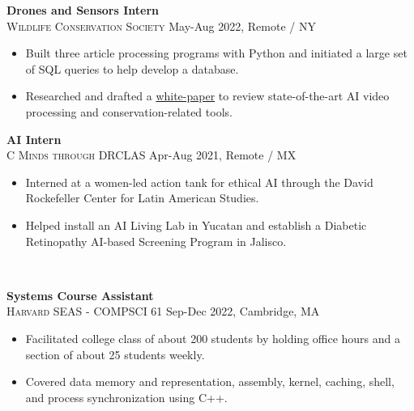 \documentclass[11pt]{article}
\begin{document}
    \noindent \textbf{Drones and Sensors Intern}\\
    \textsc{{Wildlife Conservation Society}} \hfill May-Aug 2022, Remote / NY
    \begin{itemize}[itemsep=-.4em, leftmargin=1em]\vspace{-2mm}
      \item Built three article processing programs with Python and initiated a large set of SQL queries to help develop a database.
      \item Researched and drafted a 
      \href{https://bit.ly/AI-Advancing-Video-Processing-and-CTDS}{white-paper} to review state-of-the-art AI video processing and conservation-related tools.
    \end{itemize}

    \noindent \textbf{AI Intern}\\
    \textsc{{C Minds through DRCLAS}} \hfill Apr-Aug 2021, Remote / MX
    \begin{itemize}[itemsep=-.4em, leftmargin=1em]\vspace{-2mm}
      \item Interned at a women-led action tank for ethical AI through the David Rockefeller Center for Latin American Studies.
      \item Helped install an AI Living Lab in Yucatan and establish a Diabetic Retinopathy AI-based Screening Program in Jalisco. 
    \end{itemize}

  \vspace{-7pt}\\
  \noindent\makebox[\linewidth]{\rule{7.5in}{0.3pt}}


  \noindent\textbf{Systems Course Assistant}  \\
  \textsc{Harvard SEAS - COMPSCI 61} \hfill Sep-Dec 2022, Cambridge, MA
  \begin{itemize}[itemsep=-.4em, leftmargin=1em]\vspace{-2mm}
    \item Facilitated college class of about 200 students by holding office hours and a section of about 25 students weekly.
    \item Covered data memory and representation, assembly, kernel, caching, shell, and process synchronization using C++.
  \end{itemize}
\end{document}
